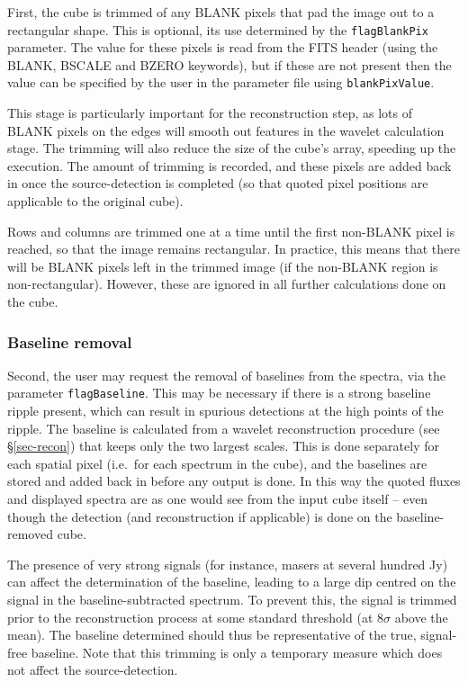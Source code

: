 \documentclass[12pt,a4paper]{article}
\newcommand{\ie}{i.e.\ }
\begin{document}
First, the cube is trimmed of any BLANK pixels that pad the image out
to a rectangular shape. This is optional, its use determined by the
\texttt{flagBlankPix} parameter. The value for these pixels is read from
the FITS header (using the BLANK, BSCALE and BZERO keywords), but if
these are not present then the value can be specified by the user in
the parameter file using \texttt{blankPixValue}.

This stage is particularly important for the reconstruction step, as
lots of BLANK pixels on the edges will smooth out features in the
wavelet calculation stage. The trimming will also reduce the size of
the cube's array, speeding up the execution. The amount of trimming is
recorded, and these pixels are added back in once the source-detection
is completed (so that quoted pixel positions are applicable to the
original cube).

Rows and columns are trimmed one at a time until the first non-BLANK
pixel is reached, so that the image remains rectangular. In practice,
this means that there will be BLANK pixels left in the trimmed image
(if the non-BLANK region is non-rectangular). However, these are
ignored in all further calculations done on the cube.

\subsubsection{Baseline removal}

Second, the user may request the removal of baselines from the
spectra, via the parameter \texttt{flagBaseline}. This may be necessary
if there is a strong baseline ripple present, which can result in
spurious detections at the high points of the ripple. The baseline is
calculated from a wavelet reconstruction procedure (see
\S\ref{sec-recon}) that keeps only the two largest scales. This is
done separately for each spatial pixel (\ie for each spectrum in the
cube), and the baselines are stored and added back in before any
output is done. In this way the quoted fluxes and displayed spectra
are as one would see from the input cube itself -- even though the
detection (and reconstruction if applicable) is done on the
baseline-removed cube.

The presence of very strong signals (for instance, masers at several
hundred Jy) can affect the determination of the baseline, leading to a
large dip centred on the signal in the baseline-subtracted
spectrum. To prevent this, the signal is trimmed prior to the
reconstruction process at some standard threshold (at $8\sigma$ above
the mean). The baseline determined should thus be representative of
the true, signal-free baseline. Note that this trimming is only a
temporary measure which does not affect the source-detection.
\end{document}

